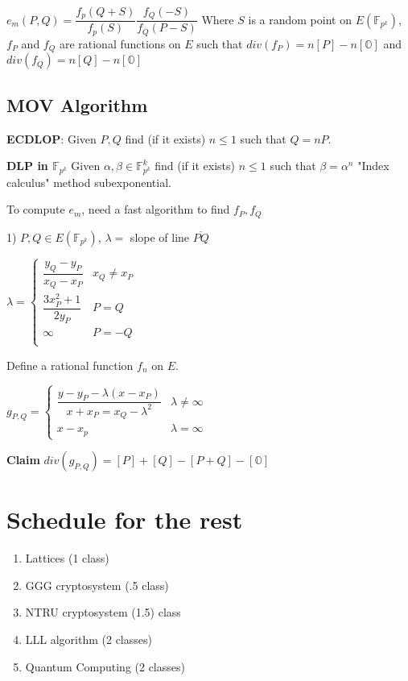 \documentclass[10pt]{article}
\newcommand{\F}{\mathbb{F}}
\renewcommand{\O}{\mathbb{O}}
\begin{document}
$e_m(P, Q) = \dfrac{f_p(Q + S)}{f_p(S)}\dfrac{f_Q(-S)}{f_Q(P-S)}$ Where $S$ is a random point on $E(\F_{p^k})$, $f_P$ and $f_Q$ are rational functions on $E$ such that $div(f_P) = n[P] - n[\O]$ and $div(f_Q) = n[Q] - n[\O]$

\subsection{MOV Algorithm}
\textbf{ECDLOP}: Given $P, Q$ find (if it exists) $n \leq 1$ such that $Q = nP$.

\textbf{DLP in $\F_{p^k}$} Given $\alpha, \beta \in \F_{p^k}^k$ find (if it exists) $n \leq 1$ such that $\beta = \alpha^n$ "Index calculus" method subexponential.

To compute $e_m$, need a fast algorithm to find $f_P, f_Q$

1) $P, Q \in E(\F_{p^k})$, $\lambda =$ slope of line $\overline{PQ}$

$\lambda = \begin{cases}
    \dfrac{y_Q - y_P}{x_Q - x_P} & x_Q \neq x_P\\
    \dfrac{3x_P^2 + 1}{2y_P} & P = Q\\
    \infty & P = -Q\\
\end{cases}$

Define a rational function $f_n$ on $E$.

$g_{P, Q} = \begin{cases}
        \dfrac{y - y_P - \lambda(x - x_P)}{x + x_P = x_Q - \lambda^2} & \lambda \neq \infty\\
        x- x_p & \lambda = \infty
\end{cases}$

\textbf{Claim} $div(g_{P, Q}) = [P] + [Q] - [P + Q] - [\O]$

\section*{Schedule for the rest}
\begin{enumerate}
    \item Lattices (1 class)
    \item GGG cryptosystem (.5 class)
    \item NTRU cryptosystem (1.5) class
    \item LLL algorithm (2 classes)
    \item Quantum Computing (2 classes)
\end{enumerate}
\end{document}
